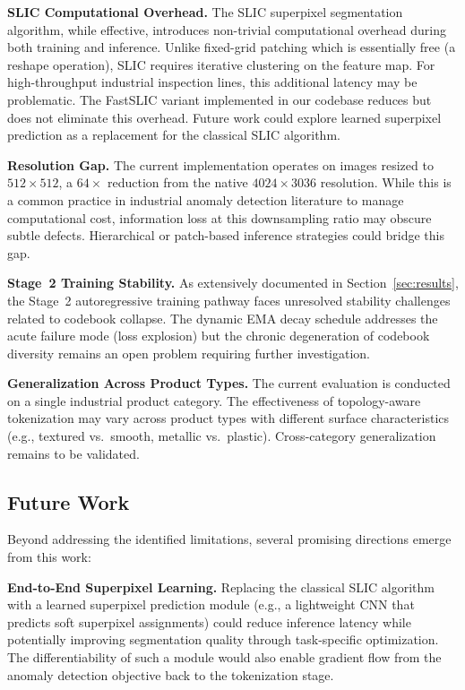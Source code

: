 \documentclass[lettersize,journal]{IEEEtran}
\begin{document}
\textbf{SLIC Computational Overhead.} The SLIC superpixel segmentation algorithm, while effective, introduces non-trivial computational overhead during both training and inference. Unlike fixed-grid patching which is essentially free (a reshape operation), SLIC requires iterative clustering on the feature map. For high-throughput industrial inspection lines, this additional latency may be problematic. The FastSLIC variant implemented in our codebase reduces but does not eliminate this overhead. Future work could explore learned superpixel prediction as a replacement for the classical SLIC algorithm.

\textbf{Resolution Gap.} The current implementation operates on images resized to $512 \times 512$, a $64\times$ reduction from the native $4024 \times 3036$ resolution. While this is a common practice in industrial anomaly detection literature to manage computational cost, information loss at this downsampling ratio may obscure subtle defects. Hierarchical or patch-based inference strategies could bridge this gap.

\textbf{Stage~2 Training Stability.} As extensively documented in Section~\ref{sec:results}, the Stage~2 autoregressive training pathway faces unresolved stability challenges related to codebook collapse. The dynamic EMA decay schedule addresses the acute failure mode (loss explosion) but the chronic degeneration of codebook diversity remains an open problem requiring further investigation.

\textbf{Generalization Across Product Types.} The current evaluation is conducted on a single industrial product category. The effectiveness of topology-aware tokenization may vary across product types with different surface characteristics (e.g., textured vs.~smooth, metallic vs.~plastic). Cross-category generalization remains to be validated.

\subsection{Future Work}

Beyond addressing the identified limitations, several promising directions emerge from this work:

\textbf{End-to-End Superpixel Learning.} Replacing the classical SLIC algorithm with a learned superpixel prediction module (e.g., a lightweight CNN that predicts soft superpixel assignments) could reduce inference latency while potentially improving segmentation quality through task-specific optimization. The differentiability of such a module would also enable gradient flow from the anomaly detection objective back to the tokenization stage.
\end{document}
